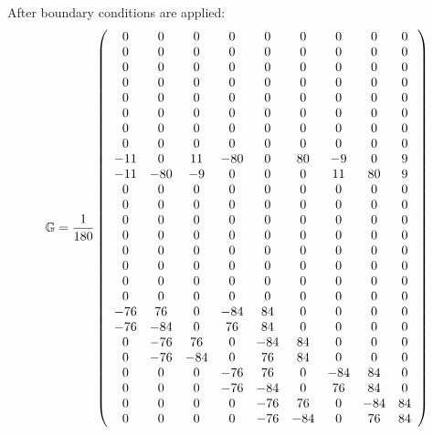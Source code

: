 After boundary conditions are applied:
\[
{\mathbb{G}}=
\frac{1}{180}
\left(
\begin{array}{ccccccccc}
 0  &   0 &   0 &   0 &   0 &    0 &   0 &   0 &   0 \\ 
  0  &   0 &   0 &   0 &   0 &    0 &   0 &   0 &   0 \\ 
  0  &   0 &   0 &   0 &   0 &    0 &   0 &   0 &   0 \\ 
  0  &   0 &   0 &   0 &   0 &    0 &   0 &   0 &   0 \\ 
  0  &   0 &   0 &   0 &   0 &    0 &   0 &   0 &   0 \\ 
  0  &   0 &   0 &   0 &   0 &    0 &   0 &   0 &   0 \\ 
  0  &   0 &   0 &   0 &   0 &    0 &   0 &   0 &   0 \\ 
  0  &   0 &   0 &   0 &   0 &    0 &   0 &   0 &   0 \\ 
-11  &   0 &  11 & -80 &   0 &   80 &  -9 &   0 &   9 \\ 
-11  & -80 &  -9 &   0 &   0 &    0 &  11 &  80 &   9 \\ 
  0  &   0 &   0 &   0 &   0 &    0 &   0 &   0 &   0 \\ 
  0  &   0 &   0 &   0 &   0 &    0 &   0 &   0 &   0 \\ 
  0  &   0 &   0 &   0 &   0 &    0 &   0 &   0 &   0 \\ 
  0  &   0 &   0 &   0 &   0 &    0 &   0 &   0 &   0 \\ 
  0  &   0 &   0 &   0 &   0 &    0 &   0 &   0 &   0 \\ 
  0  &   0 &   0 &   0 &   0 &    0 &   0 &   0 &   0 \\ 
  0  &   0 &   0 &   0 &   0 &    0 &   0 &   0 &   0 \\ 
  0  &   0 &   0 &   0 &   0 &    0 &   0 &   0 &   0 \\ 
-76  &  76 &   0 & -84 &  84 &    0 &   0 &   0 &   0 \\ 
-76  & -84 &   0 &  76 &  84 &    0 &   0 &   0 &   0 \\ 
  0  & -76 &  76 &   0 & -84 &   84 &   0 &   0 &   0 \\ 
  0  & -76 & -84 &   0 &  76 &   84 &   0 &   0 &   0 \\ 
  0  &   0 &   0 & -76 &  76 &    0 & -84 &  84 &   0 \\ 
  0  &   0 &   0 & -76 & -84 &    0 &  76 &  84 &   0 \\ 
  0  &   0 &   0 &   0 & -76 &   76 &   0 & -84 &  84 \\ 
  0  &   0 &   0 &   0 & -76 &  -84 &   0 &  76 &  84 
\end{array}
\right)
\]
